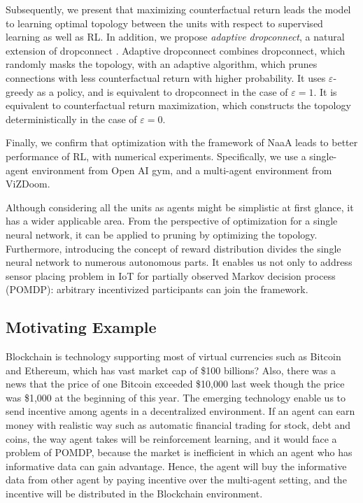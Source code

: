 Subsequently, we present that maximizing counterfactual return leads the model to learning optimal topology between the units with respect to supervised learning as well as RL.
In addition, we propose {\em adaptive dropconnect}, a natural extension of dropconnect \citep{wan2013regularization}.
Adaptive dropconnect combines dropconnect, which randomly masks the topology, with an adaptive algorithm, which prunes connections with less counterfactual return with higher probability.
It uses $\varepsilon$-greedy as a policy, and is equivalent to dropconnect in the case of $\varepsilon = 1$. It is equivalent to counterfactual return maximization, which constructs the topology deterministically in the case of $\varepsilon = 0$.

Finally, we confirm that optimization with the framework of NaaA leads to better performance of RL, with numerical experiments.
Specifically, we use a single-agent environment from Open AI gym, and a multi-agent environment from ViZDoom.

Although considering all the units as agents might be simplistic at first glance, it has a wider applicable area.
From the perspective of optimization for a single neural network, it can be applied to pruning by optimizing the topology.
Furthermore, introducing the concept of reward distribution divides the single neural network to numerous autonomous parts.
It enables us not only to address sensor placing problem in IoT for partially observed Markov decision process (POMDP): arbitrary incentivized participants can join the framework.
 
\subsection{ Motivating Example }

Blockchain is technology supporting most of virtual currencies such as Bitcoin and Ethereum, which has vast market cap of \$100 billions? Also, there was a news that the price of one Bitcoin exceeded \$10,000 last week though the price was \$1,000 at the beginning of this year. The emerging technology enable us to send incentive among agents in a decentralized environment. If an agent can earn money with realistic way such as automatic financial trading for stock, debt and coins, the way agent takes will be reinforcement learning, and it would face a problem of POMDP, because the market is inefficient in which an agent who has  informative data can gain advantage. Hence, the agent will buy the informative data from other agent by paying incentive over the multi-agent setting, and the incentive will be distributed in the Blockchain environment.



